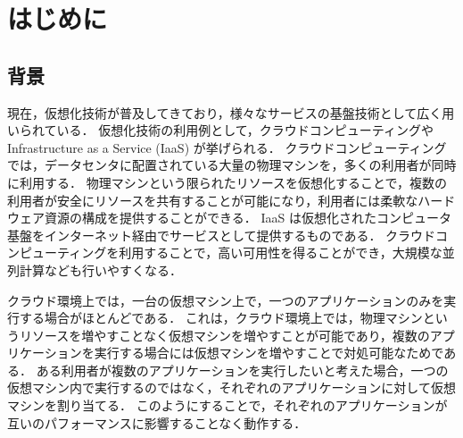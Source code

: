 \documentclass[graduation-thesis]{mlarticle}
\author{61200185 情報工学科 縣直道}
\date{\today}
\title{}
\begin{document}
\makeatletter
\renewcommand{\thetable}{
        \thesection.\arabic{table}
} %
  
\renewcommand{\thefigure}{
        \thesection.\arabic{figure}
}

\setcounter{page}{1}

\tableofcontents
\clearpage


 

\section{はじめに}
\label{intro}

\subsection {背景}
\label {intro:background}
現在，仮想化技術が普及してきており，様々なサービスの基盤技術として広く用いられている．
仮想化技術の利用例として，クラウドコンピューティングやInfrastructure as a Service (IaaS) が挙げられる．
クラウドコンピューティングでは，データセンタに配置されている大量の物理マシンを，多くの利用者が同時に利用する．
物理マシンという限られたリソースを仮想化することで，複数の利用者が安全にリソースを共有することが可能になり，利用者には柔軟なハードウェア資源の構成を提供することができる．
IaaS は仮想化されたコンピュータ基盤をインターネット経由でサービスとして提供するものである．
クラウドコンピューティングを利用することで，高い可用性を得ることができ，大規模な並列計算なども行いやすくなる．

クラウド環境上では，一台の仮想マシン上で，一つのアプリケーションのみを実行する場合がほとんどである．
これは，クラウド環境上では，物理マシンというリソースを増やすことなく仮想マシンを増やすことが可能であり，複数のアプリケーションを実行する場合には仮想マシンを増やすことで対処可能なためである．
ある利用者が複数のアプリケーションを実行したいと考えた場合，一つの仮想マシン内で実行するのではなく，それぞれのアプリケーションに対して仮想マシンを割り当てる．
このようにすることで，それぞれのアプリケーションが互いのパフォーマンスに影響することなく動作する．
\end{document}
